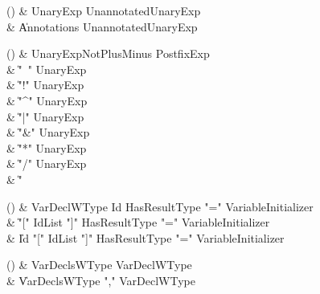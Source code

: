 \begin{bbgrammarappendix}

() & UnaryExp \label{prod:UnaryExp}  \: UnannotatedUnaryExp  \\

 &    \| Annotations UnannotatedUnaryExp \\

\end{bbgrammarappendix}

\begin{bbgrammarappendix}

() & UnaryExpNotPlusMinus \label{prod:UnaryExpNotPlusMinus}  \: PostfixExp  \\

 &    \| \xcd"~" UnaryExp \\
 &    \| \xcd"!" UnaryExp \\
 &    \| \xcd"^" UnaryExp \\
 &    \| \xcd"|" UnaryExp \\
 &    \| \xcd"&" UnaryExp \\
 &    \| \xcd"*" UnaryExp \\
 &    \| \xcd"/" UnaryExp \\
 &    \| \xcd"%

\end{bbgrammarappendix}

\begin{bbgrammarappendix}

() & VarDeclWType \label{prod:VarDeclWType}  \: Id HasResultType \xcd"=" VariableInitializer  \\

 &    \| \xcd"[" IdList \xcd"]" HasResultType \xcd"=" VariableInitializer \\
 &    \| Id \xcd"[" IdList \xcd"]" HasResultType \xcd"=" VariableInitializer \\

\end{bbgrammarappendix}

\begin{bbgrammarappendix}

() & VarDeclsWType \label{prod:VarDeclsWType}  \: VarDeclWType  \\

 &    \| VarDeclsWType \xcd"," VarDeclWType \\

\end{bbgrammarappendix}


